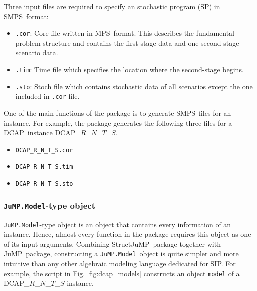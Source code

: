 \documentclass{hitec}
\newcommand{\smps}{\textsf{SMPS}}
\newcommand{\mps}{\textsf{MPS}}
\newcommand{\jump}{\textsf{JuMP}}
\newcommand{\structjump}{\textsf{StructJuMP}}
\newcommand{\dcap}{\textsf{DCAP}}
\newcommand{\jumpmodel}{\texttt{JuMP.Model}}
\newcommand{\kk}[1]{{\color{blue}From Kibaek: #1}}
\newcommand{\yoc}[1]{{\color{NavyBlue}From Yongkyu: #1}}
\begin{document}
	Three input files are required to specify an stochastic program (SP) in \smps\ format:
	\begin{itemize}
		\item \texttt{.cor}: Core file written in \mps\ format. This describes the fundamental problem structure and contains the first-stage data and one second-stage scenario data.
		\item \texttt{.tim}: Time file which specifies the location where the second-stage begins.
		\item \texttt{.sto}: Stoch file which contains stochastic data of all scenarios except the one included in \texttt{.cor} file.
	\end{itemize}
	One of the main functions of the package is to generate \smps\ files for an instance. For example, the package generates the following three files for a \dcap\ instance \dcap\_$R$\_$N$\_$T$\_$S$.
	\begin{itemize}
		\item \texttt{DCAP\_R\_N\_T\_S.cor}
		\item \texttt{DCAP\_R\_N\_T\_S.tim}
		\item \texttt{DCAP\_R\_N\_T\_S.sto}
	\end{itemize}
	
	\subsubsection{\jumpmodel-type object}
	\jumpmodel-type object is an object that contains every information of an instance. Hence, almost every function in the package requires this object as one of its input arguments. Combining \structjump\ package together with \jump\ package, constructing a \jumpmodel\ object is quite simpler and more intuitive than any other algebraic modeling language dedicated for SIP. For example, the script in Fig. \ref{fig:dcap_models} constructs an object \texttt{model} of a \dcap\_$R$\_$N$\_$T$\_$S$ instance.
	
\end{document}
